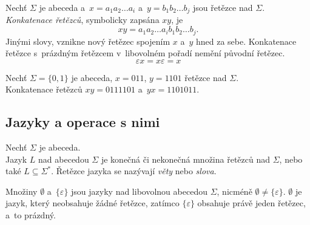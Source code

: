 \begin{definition}
    Nechť $\Sigma$ je abeceda a~$x = a_1a_2\ldots a_i$ a~$y = b_1b_2\ldots b_j$ jsou řetězce nad $\Sigma$.\\
    \emph{Konkatenace řetězců}, symbolicky zapsána $xy$, je
    \begin{equation*}
        xy = a_1a_2\ldots a_ib_1b_2\ldots b_j.
    \end{equation*}
    Jinými slovy, vznikne nový řetězec spojením $x$ a~$y$ hned za sebe.
    Konkatenace řetězce s~prázdným řetězcem v~libovolném pořadí nemění původní řetězec.
    \begin{equation*}
        \varepsilon x = x\varepsilon = x
    \end{equation*}
\end{definition}

\begin{example}
    Nechť $\Sigma = \{0, 1\}$ je abeceda, $x = 011$, $y = 1101$ řetězce nad $\Sigma$.\\
    Konkatenace řetězců $xy = 0111101$ a~$yx = 1101011$.
\end{example}

\subsection*{Jazyky a operace s nimi}
\begin{definition}
    Nechť $\Sigma$ je abeceda. \\
    Jazyk $L$ nad abecedou $\Sigma$ je konečná či nekonečná množina řetězců nad $\Sigma$, nebo také $L \subseteq \Sigma^*$.
    Řetězce jazyka se nazývají \emph{věty} nebo \emph{slova}.

    Množiny $\emptyset$ a~$\{\varepsilon\}$ jsou jazyky nad libovolnou abecedou $\Sigma$, nicméně $\emptyset \neq \{\varepsilon\}$. $\emptyset$ je jazyk, který neobsahuje žádné řetězce, zatímco $\{\varepsilon\}$ obsahuje právě jeden řetězec, a~to prázdný.
\end{definition}

